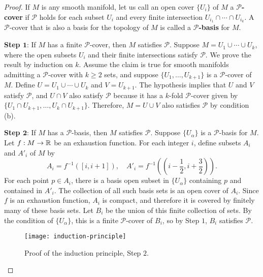 \begin{proof}
If $M$ is any smooth manifold, let us call an open cover $\{U_i\}$ of $M$ a \textbf{$\mathcal{P}$-cover} if $\mathcal{P}$ holds for each subset $U_i$ and every finite 
intersection $U_{i_1}\cap\cdots\cap U_{i_k}$. A $\mathcal{P}$-cover that is also a basis for the topology of $M$ is called a \textbf{$\mathcal{P}$-basis} for $M$.\par
\textbf{Step $\bm{1}$}: If $M$ has a finite $\mathcal{P}$-cover, then $M$ satisfies $\mathcal{P}$. Suppose $M=U_1\cup\cdots\cup U_k$, where the open subsets $U_i$ and 
their finite intersections satisfy $\mathcal{P}$. We prove the result by induction on $k$. Assume the claim is true for smooth manifolds admitting a $\mathcal{P}$-cover 
with $k\geq 2$ sets, and suppose $\{U_1,\dots,U_{k+1}\}$ is a $\mathcal{P}$-cover of $M$. Define $U=U_1\cup\cdots\cup U_k$ and $V=U_{k+1}$. The hypothesis implies that 
$U$ and $V$ satisfy $\mathcal{P}$, and $U\cap V$ also satisfy $\mathcal{P}$ because it has a $k$-fold $\mathcal{P}$-cover given by $\{U_1\cap U_{k+1},\dots,U_k\cap U_{k+1}\}$. 
Therefore, $M=U\cup V$ also satisfies $\mathcal{P}$ by condition (b).\par
\textbf{Step $\bm{2}$}: If $M$ has a $\mathcal{P}$-basis, then $M$ satisfies $\mathcal{P}$. Suppose $\{U_\alpha\}$ is a $\mathcal{P}$-basis for $M$. Let $f:M\to\mathbb{R}$ be 
an exhaustion function. For each integer $i$, define subsets $A_i$ and $A'_i$ of $M$ by
\[A_i=f^{-1}([i,i+1]),\quad A'_i=f^{-1}((i-\frac{1}{2},i+\frac{3}{2})).\]
For each point $p\in A_i$, there is a basis open subset in $\{U_\alpha\}$ containing $p$ and contained in $A'_i$. The collection of all such basis sets is an open cover 
of $A_i$. Since $f$ is an exhaustion function, $A_i$ is compact, and therefore it is covered by finitely many of these basis sets. Let $B_i$ be the union of this finite 
collection of sets. By the condition of $\{U_\alpha\}$, this is a finite $\mathcal{P}$-cover of $B_i$, so by Step $1$, $B_i$ satisfies $\mathcal{P}$.
\begin{figure}[htbp]
\centering
\texttt{[image: induction-principle]}
\caption{Proof of the induction principle, Step $2$.}
\end{figure}


\end{proof}
